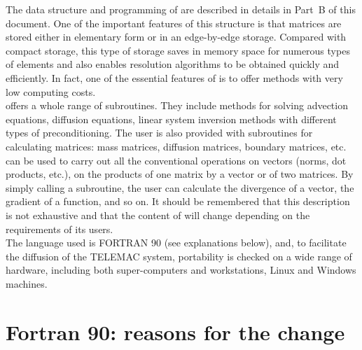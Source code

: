 The data structure and programming of \bief are described in details in Part~B of
this document. One of the important features of this structure is that matrices
are stored either in elementary form or in an edge-by-edge storage. Compared
with compact storage, this type of storage saves in memory space for numerous
types of elements and also enables resolution algorithms to be obtained quickly
and efficiently. In fact, one of the essential features of \bief is to offer
methods with very low computing costs.
\\
\bief offers a whole range of subroutines. They include methods for solving
advection equations, diffusion equations, linear system inversion methods with
different types of preconditioning. The user is also provided with subroutines
for calculating matrices: mass matrices, diffusion matrices, boundary matrices,
etc. \bief can be used to carry out all the conventional operations on vectors
(norms, dot products, etc.), on the products of one matrix by a vector or of
two matrices. By simply calling a subroutine, the user can calculate the
divergence of a vector, the gradient of a function, and so on. It should be
remembered that this description is not exhaustive and that the content of \bief
will change depending on the requirements of its users.
\\
The language used is FORTRAN 90 (see explanations below), and, to facilitate
the diffusion of the TELEMAC system, portability is checked on a wide range of
hardware, including both super-computers and workstations, Linux and Windows
machines.

\section{Fortran 90: reasons for the change}

